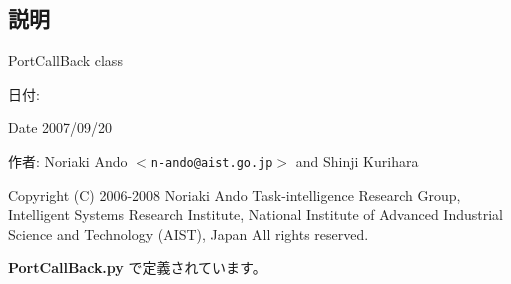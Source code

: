 \subsection{説明}
PortCallBack class 

\begin{Desc}
\item[日付:]\end{Desc}
\begin{Desc}
\item[Date]2007/09/20 \end{Desc}
\begin{Desc}
\item[作者:]Noriaki Ando $<${\tt n-ando@aist.go.jp}$>$ and Shinji Kurihara\end{Desc}
Copyright (C) 2006-2008 Noriaki Ando Task-intelligence Research Group, Intelligent Systems Research Institute, National Institute of Advanced Industrial Science and Technology (AIST), Japan All rights reserved. 

 {\bf PortCallBack.py} で定義されています。